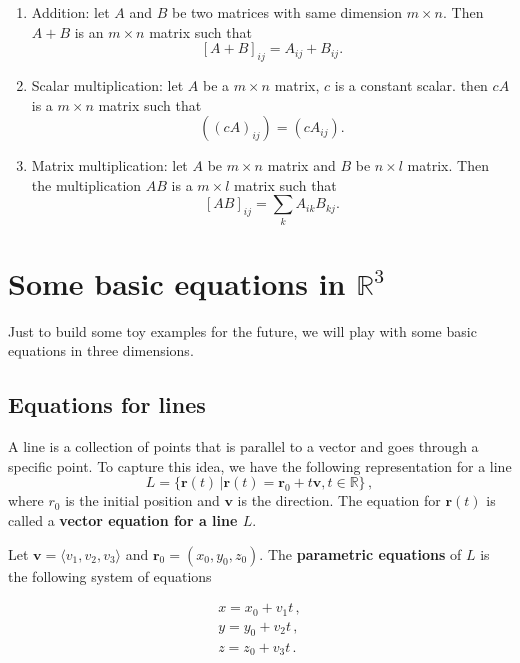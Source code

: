 \documentclass[
]{book}
\theoremstyle{definition}
\theoremstyle{definition}
\theoremstyle{definition}
\theoremstyle{definition}
\theoremstyle{remark}
\begin{document}
\begin{enumerate}
\def\labelenumi{\arabic{enumi}.}
\item
  Addition: let \(A\) and \(B\) be two matrices with same dimension \(m\times n\).
  Then \(A + B\) is an \(m\times n\) matrix such that
  \[[A + B]_{ij} = A_{ij} + B_{ij}.\]
\item
  Scalar multiplication: let \(A\) be a \(m\times n\) matrix,
  \(c\) is a constant scalar.
  then \(cA\) is a \(m\times n\) matrix such that
  \[((cA)_{ij}) = (cA_{ij}).\]
\item
  Matrix multiplication: let \(A\) be \(m\times n\) matrix and \(B\) be \(n\times l\) matrix.
  Then the multiplication \(AB\) is a \(m\times l\) matrix such that
  \[ [AB]_{ij}  =  \sum_{k} A_{ik} B_{kj} .\]
\end{enumerate}

\newpage

\chapter{\texorpdfstring{Some basic equations in \(\mathbb{R}^3\)}{Some basic equations in \textbackslash mathbb\{R\}\^{}3}}\label{some-basic-equations-in-mathbbr3}

Just to build some toy examples for the future, we will play with some basic
equations in three dimensions.

\section{Equations for lines}\label{equations-for-lines}

A line is a collection of points that is parallel to a vector and goes through a
specific point.
To capture this idea, we have the following representation for a line
\begin{equation*}
    L = \{\mathbf{r}(t) \,|  \mathbf{r}(t) = \mathbf{r}_0 + t \mathbf{v}, t\in \mathbb{R}\}  \,,
\end{equation*}
where \({r}_0\) is the initial position and \(\mathbf{v}\) is the direction.
The equation for \(\mathbf{r}(t)\) is called a \textbf{vector equation for a line \(L\)}.

Let \(\mathbf{v} = \langle v_1, v_2, v_3 \rangle\) and \(\mathbf{r}_0 = ( x_0, y_0, z_0 )\).
The \textbf{parametric equations} of \(L\) is the following system of equations

\begin{gather*}
    x = x_0 + v_1 t\,, \\
    y = y_0 + v_2 t\,, \\
    z = z_0 + v_3 t \,. 
\end{gather*}
\end{document}
